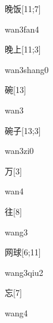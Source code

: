 \begin{verbete}{晚饭}[11;7]
\begin{pronuncia}{wan3fan4}
\end{pronuncia}
\end{verbete}

\begin{verbete}{晚上}[11;3]
\begin{pronuncia}{wan3shang0}
\end{pronuncia}
\end{verbete}

\begin{verbete}[wan3]{碗}[13]
\begin{pronuncia}{wan3}
\end{pronuncia}
\end{verbete}

\begin{verbete}[wan3zi0]{碗子}[13;3]
\begin{pronuncia}{wan3zi0}
\end{pronuncia}
\end{verbete}

\begin{verbete}[wan4]{万}[3]
\begin{pronuncia}{wan4}
\end{pronuncia}
\end{verbete}

\begin{verbete}[wang3]{往}[8]
\begin{pronuncia}{wang3}
\end{pronuncia}
\end{verbete}

\begin{verbete}{网球}[6;11]
\begin{pronuncia}{wang3qiu2}
\end{pronuncia}
\end{verbete}

\begin{verbete}[wang4]{忘}[7]
\begin{pronuncia}{wang4}
\end{pronuncia}
\end{verbete}

